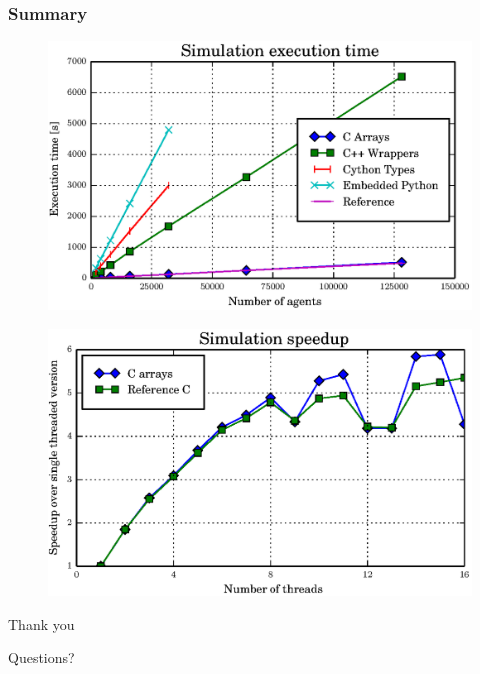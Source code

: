 \documentclass[t]{beamer}
\begin{document}
\begin{frame}[c]
	\frametitle{Summary}
	\begin{figure}[H]
	  \begin{center}
	    \includegraphics[width=0.9\columnwidth]{graphs/compared-single-perf.eps}
	  \end{center}
	\end{figure}
\end{frame}


\begin{frame}[c]
	\begin{figure}[H]
	  \begin{center}
	    \includegraphics[width=\columnwidth]{graphs/speedup.eps}
	  \end{center}
	\end{figure}
\end{frame}


\begin{frame}[c]

\begin{center}
{\fontsize{60pt}{1em}\selectfont Thank you}
\end{center}

\end{frame}


\begin{frame}[c]

\begin{center}
{\fontsize{48pt}{1em}\selectfont Questions?}
\end{center}

\end{frame}
\end{document}
